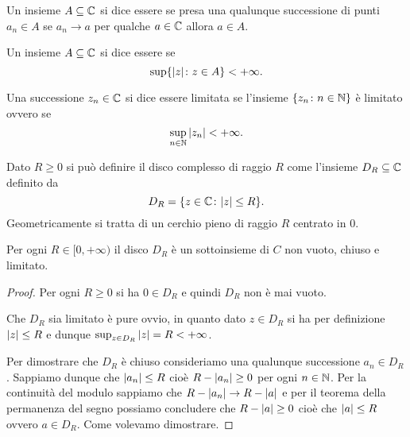 \begin{definition}
Un insieme $A\subseteq \mathbb C$ si dice
essere 
se presa una qualunque successione
di punti $a_n\in A$ se $a_n \to a$ per qualche $a\in \mathbb C$
allora $a\in A$.
\end{definition}

\begin{definition}[limitatezza]
Un insieme $A\subseteq \mathbb C$ si dice essere 
se
\[
  \sup \{ {\left|z\right|}\colon z \in A\} < +\infty.
\]

Una successione $z_n\in \mathbb C$ si dice essere limitata se l'insieme
$\{z_n\colon n\in \mathbb N\}$ è limitato ovvero se
\[
  \sup_{n\in \mathbb N} {\left|z_n\right|} < +\infty.
\]
\end{definition}

\begin{definition}[disco]
Dato $R\ge 0$ si può definire il disco complesso di raggio $R$ come
l'insieme $D_R\subseteq \mathbb C$ definito da
\[
  D_R = \{z\in \mathbb C\colon {\left|z\right|} \le R\}.
\]
Geometricamente si tratta di un cerchio pieno di raggio $R$ centrato in $0$.
\end{definition}

\begin{theorem}
Per ogni $R\in [0,+\infty)$ il disco $D_R$ è un sottoinsieme di $C$ non vuoto, chiuso e limitato.
\end{theorem}
%
\begin{proof}
Per ogni $R\ge 0$ si ha $0\in D_R$ e quindi $D_R$ non è mai vuoto.

Che $D_R$ sia limitato è pure ovvio,
in quanto dato $z\in D_R$ si ha per
definizione ${\left|z\right|}\le R$ e dunque $\sup_{z\in D_R} {\left|z\right|} = R < +\infty$.

Per dimostrare che $D_R$ è chiuso consideriamo una qualunque successione $a_n \in D_R$. Sappiamo dunque che ${\left|a_n\right|} \le R$
cioè $R-{\left|a_n\right|} \ge 0$ per ogni $n\in \mathbb N$.
Per la continuità del modulo sappiamo che $R-{\left|a_n\right|}\to R-{\left|a\right|}$
e per il teorema della permanenza del segno possiamo concludere che $R-{\left|a\right|}\ge 0$ cioè che ${\left|a\right|}\le R$ ovvero $a \in D_R$. Come volevamo dimostrare.
\end{proof}

